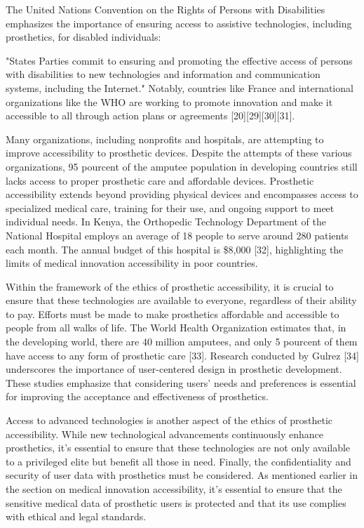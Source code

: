 The United Nations Convention on the Rights of Persons with Disabilities emphasizes the importance of ensuring access to assistive technologies, including prosthetics, for disabled individuals:

"States Parties commit to ensuring and promoting the effective access of persons with disabilities to new technologies and information and communication systems, including the Internet." Notably, countries like France and international organizations like the WHO are working to promote innovation and make it accessible to all through action plans or agreements [20][29][30][31].

Many organizations, including nonprofits and hospitals, are attempting to improve accessibility to prosthetic devices. Despite the attempts of these various organizations, 95 pourcent of the amputee population in developing countries still lacks access to proper prosthetic care and affordable devices. Prosthetic accessibility extends beyond providing physical devices and encompasses access to specialized medical care, training for their use, and ongoing support to meet individual needs. In Kenya, the Orthopedic Technology Department of the National Hospital employs an average of 18 people to serve around 280 patients each month. The annual budget of this hospital is \$8,000 [32], highlighting the limits of medical innovation accessibility in poor countries.

Within the framework of the ethics of prosthetic accessibility, it is crucial to ensure that these technologies are available to everyone, regardless of their ability to pay. Efforts must be made to make prosthetics affordable and accessible to people from all walks of life. The World Health Organization estimates that, in the developing world, there are 40 million amputees, and only 5 pourcent of them have access to any form of prosthetic care [33]. Research conducted by Gulrez [34] underscores the importance of user-centered design in prosthetic development. These studies emphasize that considering users' needs and preferences is essential for improving the acceptance and effectiveness of prosthetics.

Access to advanced technologies is another aspect of the ethics of prosthetic accessibility. While new technological advancements continuously enhance prosthetics, it’s essential to ensure that these technologies are not only available to a privileged elite but benefit all those in need.
Finally, the confidentiality and security of user data with prosthetics must be considered. As mentioned earlier in the section on medical innovation accessibility, it’s essential to ensure that the sensitive medical data of prosthetic users is protected and that its use complies with ethical and legal standards.

